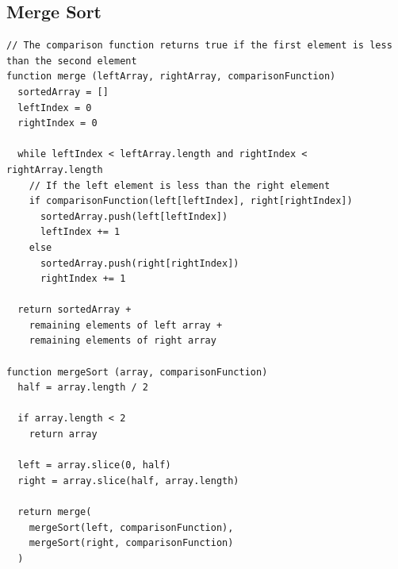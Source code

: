 \documentclass[12pt]{report}
\begin{document}
\subsection*{Merge Sort}
\begin{verbatim}
// The comparison function returns true if the first element is less than the second element
function merge (leftArray, rightArray, comparisonFunction)
  sortedArray = []
  leftIndex = 0
  rightIndex = 0

  while leftIndex < leftArray.length and rightIndex < rightArray.length
    // If the left element is less than the right element
    if comparisonFunction(left[leftIndex], right[rightIndex])
      sortedArray.push(left[leftIndex])
      leftIndex += 1
    else
      sortedArray.push(right[rightIndex])
      rightIndex += 1

  return sortedArray +
    remaining elements of left array +
    remaining elements of right array

function mergeSort (array, comparisonFunction)
  half = array.length / 2

  if array.length < 2
    return array

  left = array.slice(0, half)
  right = array.slice(half, array.length)

  return merge(
    mergeSort(left, comparisonFunction),
    mergeSort(right, comparisonFunction)
  )
\end{verbatim}

\newpage
\end{document}
